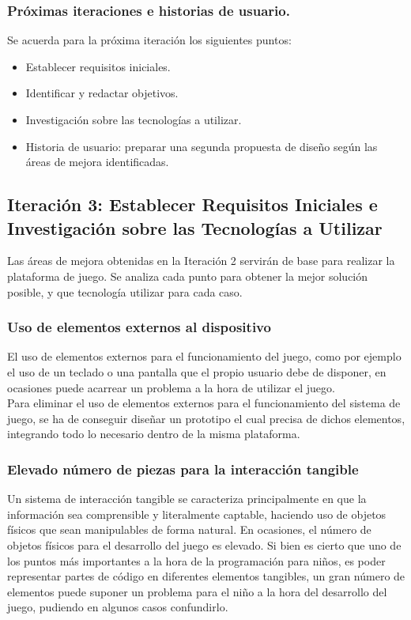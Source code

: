 \subsubsection{Próximas iteraciones e historias de usuario.}
Se acuerda para la próxima iteración los siguientes puntos:
\begin{itemize}
\item Establecer requisitos iniciales.
\item Identificar y redactar objetivos.
\item Investigación sobre las tecnologías a utilizar.
\item Historia de usuario: preparar una segunda propuesta de diseño según las áreas de mejora identificadas.
\end{itemize}


\subsection{Iteración 3: Establecer Requisitos Iniciales e Investigación sobre las Tecnologías a Utilizar}

Las áreas de mejora obtenidas en la Iteración 2 servirán de base para realizar la plataforma de juego. Se analiza cada punto para obtener la mejor solución posible, y que tecnología utilizar para cada caso.

\subsubsection{Uso de elementos externos al dispositivo}
El uso de elementos externos para el funcionamiento del juego, como por ejemplo el uso de un teclado o una pantalla que el propio usuario debe de disponer, en ocasiones puede acarrear un problema a la hora de utilizar el juego.\\ 
Para eliminar el uso de elementos externos para el funcionamiento del sistema de juego, se ha de conseguir diseñar un prototipo el cual precisa de dichos elementos, integrando todo lo necesario dentro de la misma plataforma. 

\subsubsection{Elevado número de piezas para la interacción tangible}
Un sistema de interacción tangible se caracteriza principalmente en que la información sea comprensible y literalmente captable, haciendo uso de objetos físicos que sean manipulables de forma natural. En ocasiones, el número de objetos físicos para el desarrollo del juego es elevado. Si bien es cierto que uno de los puntos más importantes a la hora de la programación para niños, es poder representar partes de código en diferentes elementos tangibles, un gran número de elementos puede suponer un problema para el niño a la hora del desarrollo del juego, pudiendo en algunos casos confundirlo. 

